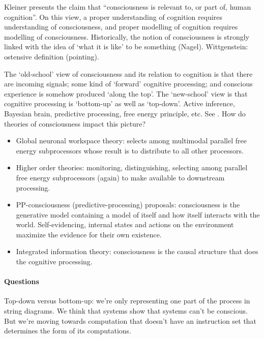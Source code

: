
\begin{affils}
\end{affils}

Kleiner presents the claim that ``consciousness is relevant to, or part of, human
cognition''.
On this view, a proper understanding of cognition requires understanding of
consciousness, and proper modelling of cognition requires modelling of consciousness.
Historically, the notion of consciousness is strongly linked with the idea of `what it
is like' to be something (Nagel).
Wittgenstein: ostensive definition (pointing).

The `old-school' view of consciousness and its relation to cognition is that there are
incoming signals; some kind of `forward' cognitive processing; and conscious experience
is somehow produced `along the top'.
The `new-school' view is that cognitive processing is `bottom-up' as well as
`top-down'.
Active inference, Bayesian brain, predictive processing, free energy principle, etc.
See \textcites{Allen2018}{Tull2023}.
How do theories of consciousness impact this picture?
\begin{itemize}
  \item Global neuronal workspace theory: selects among multimodal parallel free energy
        subprocessors whose result is to distribute to all other processors.
  \item Higher order theories: monitoring, distinguishing, selecting among parallel free energy
        subprocessors (again) to make available to downstream processing.
  \item PP-consciousness (predictive-processing) proposals: consciousness is the generative
        model containing a model of itself and how itself interacts with the world.
        Self-evidencing, internal states and actions on the environment maximize the evidence
        for their own existence.
  \item Integrated information theory: consciousness is the causal structure that does the
        cognitive processing.
\end{itemize}

\paragraph{Questions}

Top-down versus bottom-up: we're only representing one part of the process in string
diagrams.
We think that systems show that systems can't be conscious.
But we're moving towards computation that doesn't have an instruction set that
determines the form of its computations.
